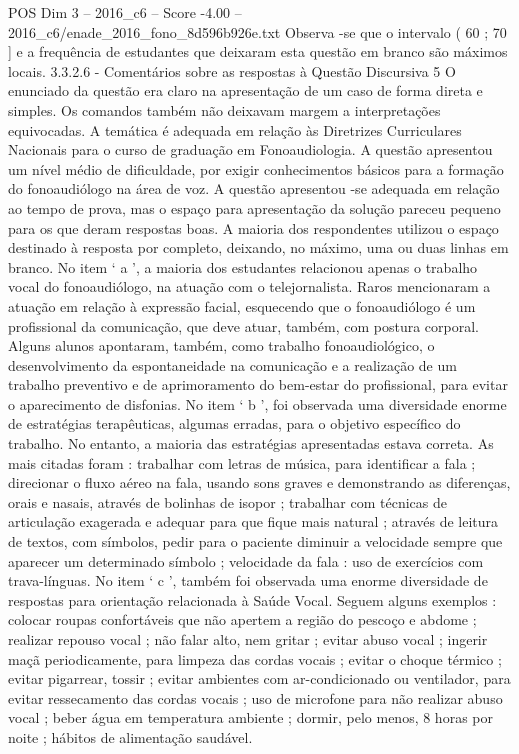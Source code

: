 \begin{textsample}{POS Dim 3 – 2016\_c6 – Score -4.00 – 2016\_c6/enade\_2016\_fono\_8d596b926e.txt}
Observa -se que o intervalo ( 60 ; 70 ] e a frequência de estudantes que deixaram esta questão em branco são máximos locais. 3.3.2.6 - Comentários sobre as respostas à Questão Discursiva 5 O enunciado da questão era claro na apresentação de um caso de forma direta e simples.
Os comandos também não deixavam margem a interpretações equivocadas.
A temática é adequada em relação às Diretrizes Curriculares Nacionais para o curso de graduação em Fonoaudiologia.
A questão apresentou um nível médio de dificuldade, por exigir conhecimentos básicos para a formação do fonoaudiólogo na área de voz.
A questão apresentou -se adequada em relação ao tempo de prova, mas o espaço para apresentação da solução pareceu pequeno para os que deram respostas boas.
A maioria dos respondentes utilizou o espaço destinado à resposta por completo, deixando, no máximo, uma ou duas linhas em branco.
No item ‘ a ’, a maioria dos estudantes relacionou apenas o trabalho vocal do fonoaudiólogo, na atuação com o telejornalista.
Raros mencionaram a atuação em relação à expressão facial, esquecendo que o fonoaudiólogo é um profissional da comunicação, que deve atuar, também, com postura corporal.
Alguns alunos apontaram, também, como trabalho fonoaudiológico, o desenvolvimento da espontaneidade na comunicação e a realização de um trabalho preventivo e de aprimoramento do bem-estar do profissional, para evitar o aparecimento de disfonias.
No item ‘ b ’, foi observada uma diversidade enorme de estratégias terapêuticas, algumas erradas, para o objetivo específico do trabalho.
No entanto, a maioria das estratégias apresentadas estava correta.
As mais citadas foram : trabalhar com letras de música, para identificar a fala ; direcionar o fluxo aéreo na fala, usando sons graves e demonstrando as diferenças, orais e nasais, através de bolinhas de isopor ; trabalhar com técnicas de articulação exagerada e adequar para que fique mais natural ; através de leitura de textos, com símbolos, pedir para o paciente diminuir a velocidade sempre que aparecer um determinado símbolo ; velocidade da fala : uso de exercícios com trava-línguas.
No item ‘ c ’, também foi observada uma enorme diversidade de respostas para orientação relacionada à Saúde Vocal.
Seguem alguns exemplos : colocar roupas confortáveis que não apertem a região do pescoço e abdome ; realizar repouso vocal ; não falar alto, nem gritar ; evitar abuso vocal ; ingerir maçã periodicamente, para limpeza das cordas vocais ; evitar o choque térmico ; evitar pigarrear, tossir ; evitar ambientes com ar-condicionado ou ventilador, para evitar ressecamento das cordas vocais ; uso de microfone para não realizar abuso vocal ; beber água em temperatura ambiente ; dormir, pelo menos, 8 horas por noite ; hábitos de alimentação saudável.

\end{textsample}

